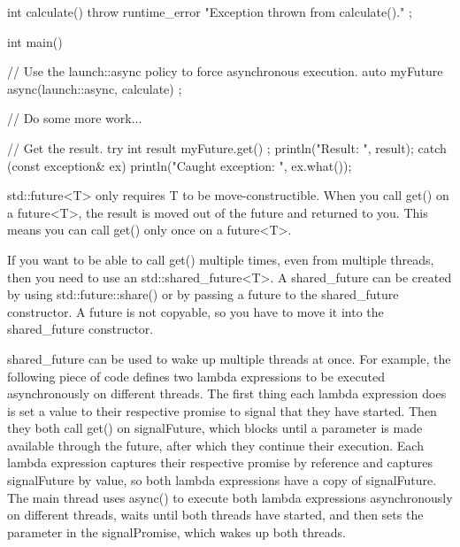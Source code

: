 \begin{cpp}
int calculate()
{
    throw runtime_error { "Exception thrown from calculate()." };
}

int main()
{
    // Use the launch::async policy to force asynchronous execution.
    auto myFuture { async(launch::async, calculate) };

    // Do some more work...

    // Get the result.
    try {
        int result { myFuture.get() };
        println("Result: {}", result);
    } catch (const exception& ex) {
        println("Caught exception: {}", ex.what());
    }
}
\end{cpp}


std::future<T> only requires T to be move-constructible. When you call get() on a future<T>, the result is moved out of the future and returned to you. This means you can call get() only once on a future<T>.

If you want to be able to call get() multiple times, even from multiple threads, then you need to use an std::shared\_future<T>. A shared\_future can be created by using std::future::share() or by passing a future to the shared\_future constructor. A future is not copyable, so you have to move it into the shared\_future constructor.

shared\_future can be used to wake up multiple threads at once. For example, the following piece of code defines two lambda expressions to be executed asynchronously on different threads. The first thing each lambda expression does is set a value to their respective promise to signal that they have started. Then they both call get() on signalFuture, which blocks until a parameter is made available through the future, after which they continue their execution. Each lambda expression captures their respective promise by reference and captures signalFuture by value, so both lambda expressions have a copy of signalFuture. The main thread uses async() to execute both lambda expressions asynchronously on different threads, waits until both threads have started, and then sets the parameter in the signalPromise, which wakes up both threads.

